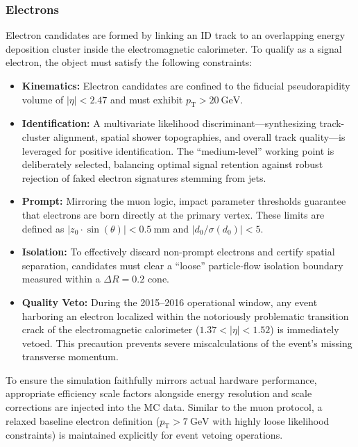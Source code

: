 \subsubsection{Electrons}
Electron candidates are formed by linking an ID track to an overlapping energy deposition cluster inside the electromagnetic calorimeter. To qualify as a signal electron, the object must satisfy the following constraints:
\begin{itemize}
    \item \textbf{Kinematics:} Electron candidates are confined to the fiducial pseudorapidity volume of $|\eta| < 2.47$ and must exhibit $p_{\text{T}} > 20~\text{GeV}$.
    \item \textbf{Identification:} A multivariate likelihood discriminant—synthesizing track-cluster alignment, spatial shower topographies, and overall track quality—is leveraged for positive identification. The ``medium-level'' working point is deliberately selected, balancing optimal signal retention against robust rejection of faked electron signatures stemming from jets.
    \item \textbf{Prompt:} Mirroring the muon logic, impact parameter thresholds guarantee that electrons are born directly at the primary vertex. These limits are defined as $|z_0 \cdot \sin(\theta)| < 0.5~\text{mm}$ and $|d_0/\sigma(d_0)| < 5$.
    \item \textbf{Isolation:} To effectively discard non-prompt electrons and certify spatial separation, candidates must clear a ``loose'' particle-flow isolation boundary measured within a $\Delta R = 0.2$ cone.
    \item \textbf{Quality Veto:} During the 2015--2016 operational window, any event harboring an electron localized within the notoriously problematic transition crack of the electromagnetic calorimeter ($1.37 < |\eta| < 1.52$) is immediately vetoed. This precaution prevents severe miscalculations of the event's missing transverse momentum.
\end{itemize}
To ensure the simulation faithfully mirrors actual hardware performance, appropriate efficiency scale factors alongside energy resolution and scale corrections are injected into the MC data. Similar to the muon protocol, a relaxed baseline electron definition ($p_{\text{T}} > 7~\text{GeV}$ with highly loose likelihood constraints) is maintained explicitly for event vetoing operations.


